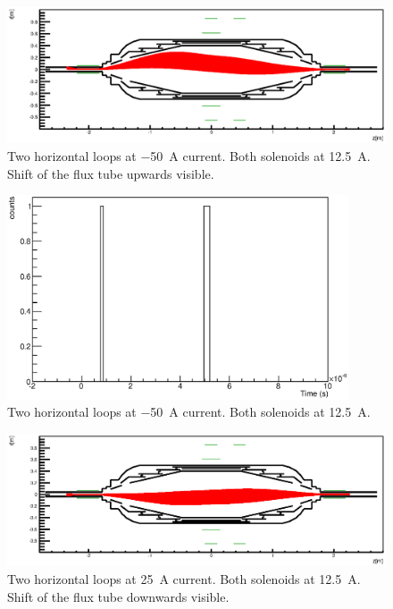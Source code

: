\begin{figure}
\centering
	\centerline{\includegraphics[width = 1.3\linewidth]{graphics/analysis/monSpec/fieldSimulation/NE.eps} }
	
	\caption[\SI{-50}{\ampere} loops]{Two horizontal loops at \SI{-50}{\ampere} current. Both solenoids at \SI{12.5}{\ampere}. Shift of the flux tube upwards visible.}
	\label{fig:NEf}
\end{figure}

\begin{figure}
\centering
	\includegraphics[width = 0.9\textwidth]{graphics/analysis/monSpec/NE.eps}
	\caption[\SI{-50}{\ampere} loops analysis]{Two horizontal loops at \SI{-50}{\ampere} current. Both solenoids at \SI{12.5}{\ampere}.}
	\label{fig:NE}
\end{figure}
\clearpage





\begin{figure}
\centering
	\centerline{\includegraphics[width = 1.3\linewidth]{graphics/analysis/monSpec/fieldSimulation/NC.eps} }
	
	\caption[\SI{25}{\ampere} loops]{Two horizontal loops at \SI{25}{\ampere} current. Both solenoids at \SI{12.5}{\ampere}. Shift of the flux tube downwards visible.}
	\label{fig:NCf}
\end{figure}

